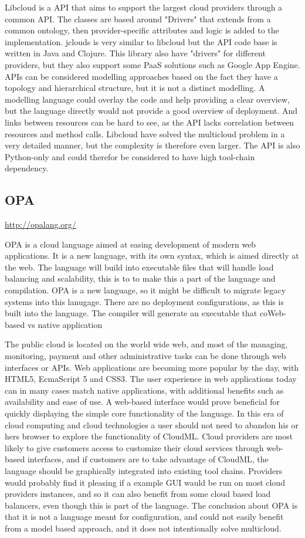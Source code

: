 Libcloud is a API that aims to support the largest cloud providers through a common API. 
The classes are based around "Drivers" that extends from a common ontology, then provider-specific attributes and logic is added to the implementation.
jclouds is very similar to libcloud but the API code base is written in Java and Clojure. 
This library also have "drivers" for different providers, but they also support some PaaS solutions such as Google App Engine.
APIs can be considered modelling approaches based on the fact they have a topology and hierarchical structure, 
but it is not a distinct modelling. A modelling language could overlay the code and help providing a clear overview, 
but the language directly would not provide a good overview of deployment. 
And links between resources can be hard to see, as the API lacks correlation between resources and method calls. 
Libcloud have solved the multicloud problem in a very detailed manner, but the complexity is therefore even larger. 
The API is also Python-only and could therefor be considered to have high tool-chain dependency.

\subsection{OPA}
\url{http://opalang.org/}

OPA is a cloud language aimed at easing development of modern web applications. It is a new language, 
with its own syntax, which is aimed directly at the web. The language will build into executable files that will handle load balancing and scalability, 
this is to to make this a part of the language and compilation.
OPA is a new language, so it might be difficult to migrate legacy systems into this lanugage. 
There are no deployment configurations, as this is built into the language. The compiler will generate an executable that coWeb-based vs native application

The public cloud is located on the world wide web, and most of the managing, monitoring, 
payment and other administrative tasks can be done through web interfaces or APIs. 
Web applications are becoming more popular by the day, with HTML5, EcmaScript 5 and CSS3. 
The user experience in web applications today can in many cases match native applications, with additional benefits such as availability and ease of use.
A web-based interface would prove beneficial for quickly displaying the simple core functionality of the language. 
In this era of cloud computing and cloud technologies a user should not need to abandon his or hers browser to explore the functionality of CloudML.
Cloud providers are most likely to give customers access to customize their cloud services through web-based interfaces, 
and if customers are to take advantage of CloudML, the language should be graphically integrated into existing tool chains. 
Providers would probably find it pleasing if a example GUI wauld be run on most cloud providers instances, 
and so it can also benefit from some cloud based load balancers, even though this is part of the language. 
The conclusion about OPA is that it is not a language meant for configuration, and could not easily benefit from a model based approach, 
and it does not intentionally solve multicloud.

